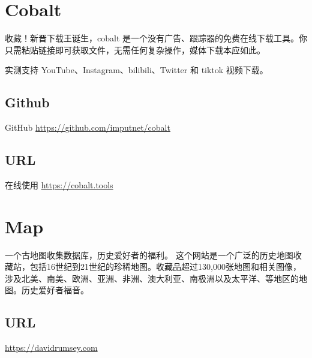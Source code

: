 \documentclass[11pt]{article}
\date{\today}
\title{}
\begin{document}
\tableofcontents

\section{Cobalt}
\label{sec:org3a8bb84}
收藏！新晋下载王诞生，cobalt 是一个没有广告、跟踪器的免费在线下载工具。你只需粘贴链接即可获取文件，无需任何复杂操作，媒体下载本应如此。

实测支持 YouTube、Instagram、bilibili、Twitter 和 tiktok 视频下载。 
\subsection{Github}
\label{sec:orgd2efa3c}
GitHub \url{https://github.com/imputnet/cobalt}
\subsection{URL}
\label{sec:org9185b16}
在线使用 \url{https://cobalt.tools}

\section{Map}
\label{sec:org9d362ad}
一个古地图收集数据库，历史爱好者的福利。
这个网站是一个广泛的历史地图收藏站，包括16世纪到21世纪的珍稀地图。收藏品超过130,000张地图和相关图像，涉及北美、南美、欧洲、亚洲、非洲、澳大利亚、南极洲以及太平洋、等地区的地图。历史爱好者福音。
\subsection{URL}
\label{sec:org0a351e4}
\url{https://davidrumsey.com}
\end{document}
